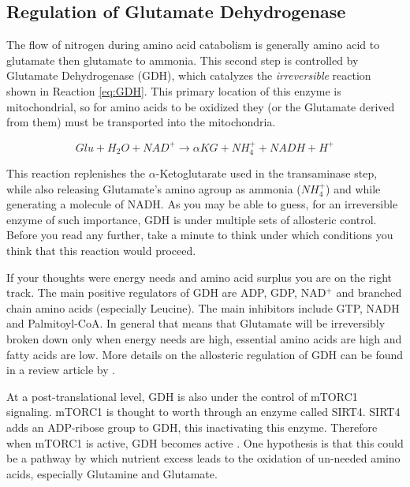 \documentclass{tufte-handout}
\begin{document}
\subsection{Regulation of Glutamate Dehydrogenase}

The flow of nitrogen during amino acid catabolism is generally amino acid to glutamate then glutamate to ammonia.  This second step is controlled by Glutamate Dehydrogenase (GDH), which catalyzes the \emph{irreversible} reaction shown in Reaction \ref{eq:GDH}.  This primary location of this enzyme is mitochondrial, so for amino acids to be oxidized they (or the Glutamate derived from them) must be transported into the mitochondria.

\begin{equation}\label{eq:GDH}
Glu + H_2O + NAD^+  \rightarrow  \alpha KG + NH_4^+ + NADH + H^+
\end{equation}

This reaction replenishes the $\alpha$-Ketoglutarate used in the transaminase step, while also releasing Glutamate's amino agroup as ammonia ($NH_4^+$) and while generating a molecule of NADH.  As you may be able to guess, for an irreversible enzyme of such importance, GDH is under multiple sets of allosteric control.  Before you read any further, take a minute to think under which conditions you think that this reaction would proceed.

If your thoughts were energy needs and amino acid surplus you are on the right track.  The main positive regulators of GDH are ADP, GDP, NAD$^+$ and branched chain amino acids (especially Leucine).  The main inhibitors include GTP, NADH and Palmitoyl-CoA.  In general that means that Glutamate will be irreversibly broken down only when energy needs are high, essential amino acids are high and fatty acids are low.  More details on the allosteric regulation of GDH can be found in a review article by \citet{Smith2008}.  

At a post-translational level, GDH is also under the control of mTORC1 signaling.  mTORC1 is thought to worth through an enzyme called SIRT4.  SIRT4 adds an ADP-ribose group to GDH, this inactivating this enzyme.  Therefore when mTORC1 is active, GDH becomes active \citep{Csibi2013}.  One hypothesis is that this could be a pathway by which nutrient excess leads to the oxidation of un-needed amino acids, especially Glutamine and Glutamate.
\end{document}
